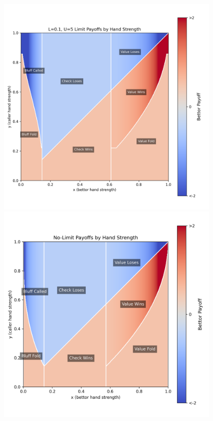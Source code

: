 \documentclass[a4paper,12pt]{article}
\theoremstyle{plain}
\theoremstyle{definition}
\begin{document}
\begin{figure}[h!]
\begin{adjustwidth}{-1in}{-1in}
\begin{minipage}{0.55\textwidth}
        \end{minipage}
        \vspace{0.5cm}\\
        \begin{minipage}{0.55\textwidth}
            \centering
            \includegraphics[width=\textwidth]{LU_payoffs_0.1_5.png}
        \end{minipage}
        \hspace{0.05\textwidth}
        \begin{minipage}{0.55\textwidth}
            \centering
            \includegraphics[width=\textwidth]{payoff_heatmap_with_regions_labeled.png}

\end{minipage}
\end{adjustwidth}
\end{figure}
\end{document}
